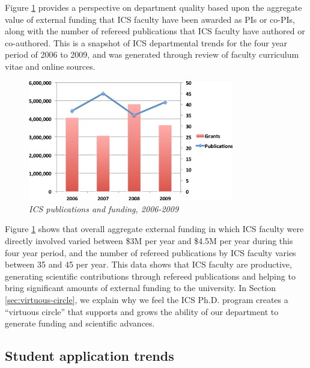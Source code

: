 \documentclass[12pt]{article}
\begin{document}
Figure \ref{fig:pubs-and-grants} provides a perspective on department
quality based upon the aggregate value of external funding that ICS faculty
have been awarded as PIs or co-PIs, along with the number of refereed
publications that ICS faculty have authored or co-authored.  This is a
snapshot of ICS departmental trends for the four year period of 2006 to
2009, and was generated through review of faculty curriculum vitae and
online sources.

\begin{figure}[ht]
  \center
  \includegraphics[width=0.8\textwidth]{pubs-and-grants.eps}
  \caption{\em \small ICS publications and funding, 2006-2009}
  \label{fig:pubs-and-grants}
\end{figure} 

Figure \ref{fig:pubs-and-grants} shows that overall aggregate external
funding in which ICS faculty were directly involved varied between \$3M per
year and \$4.5M per year during this four year period, and the number of
refereed publications by ICS faculty varies between 35 and 45 per year.
This data shows that ICS faculty are productive, generating scientific
contributions through refereed publications and helping to bring
significant amounts of external funding to the university. In Section
\ref{sec:virtuous-circle}, we explain why we feel the ICS Ph.D. program
creates a ``virtuous circle'' that supports and grows the ability of our
department to generate funding and scientific advances. 


\subsection{Student application trends}
\end{document}
